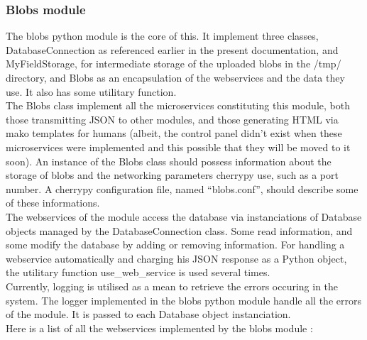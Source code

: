 \subsubsection{Blobs module}

The blobs python module is the core of this. It implement three classes, DatabaseConnection as referenced earlier in the present documentation, and MyFieldStorage, for intermediate storage of the uploaded blobs in the /tmp/ directory, and Blobs as an encapsulation of the webservices and the data they use. It also has some utilitary function. \\

The Blobs class implement all the microservices constituting this module, both those transmitting JSON to other modules, and those generating HTML via mako templates for humans (albeit, the control panel didn't exist when these microservices were implemented and this possible that they will be moved to it soon). An instance of the Blobs class should possess information about the storage of blobs and the networking parameters cherrypy use, such as a port number. A cherrypy configuration file, named ``blobs.conf'', should describe some of these informations. \\

The webservices of the module access the database via instanciations of Database objects managed by the DatabaseConnection class. Some read information, and some modify the database by adding or removing information. For handling a webservice automatically and charging his JSON response as a Python object, the utilitary function use\_web\_service is used several times. \\

Currently, logging is utilised as a mean to retrieve the errors occuring in the system. The logger implemented in the blobs python module handle all the errors of the module. It is passed to each Database object instanciation.\\

Here is a list of all the webservices implemented by the blobs module : \\

